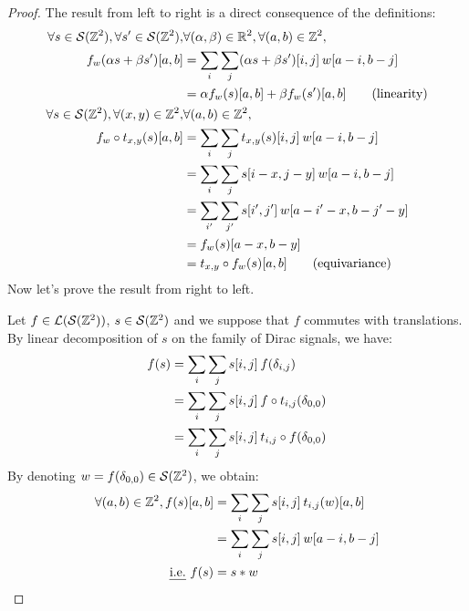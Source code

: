 \begin{proof}
The result from left to right is a direct consequence of the definitions:
\begin{align}
\forall s \in \cs(\bbz^2), \forall s' \in \cs(\bbz^2), & \forall (\alpha, \beta) \in \bbr^2,\forall (a,b) \in \bbz^2,\nonumber\\
 f_w(\alpha s + \beta s')[a,b] & = \displaystyle \sum_i \sum_j (\alpha s + \beta s')[i,j] \h{2} w[a-i, b-j]\nonumber\\
 & = \alpha f_w(s)[a,b] + \beta f_w(s')[a,b] \tag{linearity}\\
\forall s \in \cs(\bbz^2), \forall (x, y) \in \bbz^2, & \forall (a,b) \in \bbz^2,\nonumber\\
f_w \circ t_{x,y} (s)[a,b] & = \displaystyle \sum_i \sum_j t_{x,y}(s)[i,j] \h{2} w[a-i, b-j]\nonumber\\
 & = \displaystyle \sum_i \sum_j s[i - x,j - y] \h{2} w[a-i, b-j]\nonumber\\
 & = \displaystyle \sum_{i'} \sum_{j'} s[i',j'] \h{2} w[a - i' - x, b - j'- y]\label{eq:bij}\\
 & = f_w (s)[a - x,b - y]\nonumber\\
 & = t_{x,y} \circ f_w (s)[a,b] \tag{equivariance}
\end{align}
Now let's prove the result from right to left.

Let $f \in \cl(\cs(\bbz^2))$, $s \in \cs(\bbz^2)$ and we suppose that $f$ commutes with translations. By linear decomposition of $s$ on the family of Dirac signals, we have:
\begin{align*}
f(s) & = \displaystyle \sum_i \sum_j s[i,j] \h{2} f(\delta_{i,j})\\
 & = \displaystyle \sum_i \sum_j s[i,j] \h{2} f \circ t_{i,j} (\delta_{0,0})\\
 & = \displaystyle \sum_i \sum_j s[i,j] \h{2} t_{i,j} \circ f (\delta_{0,0})
\end{align*}
By denoting $w = f (\delta_{0,0}) \in \cs(\bbz^2)$, we obtain:
\begin{align}
\forall (a,b) \in \bbz^2, f(s)[a,b] & = \displaystyle \sum_i \sum_j s[i,j] \h{2} t_{i,j}(w)[a,b] \label{eq:conv}\\
 & = \displaystyle \sum_i \sum_j s[i,j] \h{2} w[a-i, b-j] \nonumber\\
\text{\ie } f(s) & = s \ast w \nonumber
\end{align}
\end{proof}

